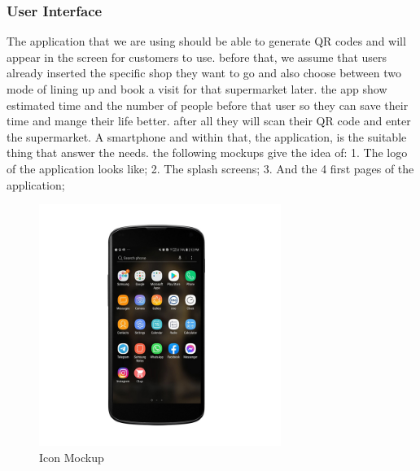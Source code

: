 \subsubsection{User Interface}
% 
The application that we are using should be able to generate QR codes and will appear in the screen for customers to use. before that, we assume that users already inserted the specific shop they want to go and also choose between two mode of lining up and book a visit for that supermarket later. the app show  estimated time and the number of people before that user so they can save their time and  mange their life better. after all they will scan their QR code and enter the supermarket.
A smartphone and within that, the application, is the suitable thing that answer the needs.
the following mockups give the idea of:
1. The logo of the application looks like;
2. The splash screens;
3. And the 4 first pages of the application;
\begin{figure}[H]
  \centering
  \includegraphics[width=0.7\textwidth,keepaspectratio]{images/1.jpg}
  \caption{Icon Mockup}
\end{figure}
